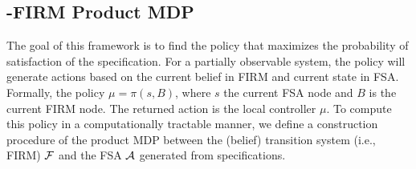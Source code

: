 \documentclass[letterpaper]{article} %
\begin{document}

\subsection{\DTL-FIRM Product MDP}
\label{sec:DTL-FIRM}
The goal of this framework is to find the policy that maximizes the probability of satisfaction of the \DTL specification. For a partially observable system, the policy will generate actions based on the current belief in FIRM and current state in FSA. Formally, the policy $\mu=\pi(s,B)$, where $s$ the current FSA node and $B$ is the current FIRM node. The returned action is the local controller $\mu$.
To compute this policy in a computationally tractable manner, we define a construction procedure of the product MDP between the (belief) transition system (i.e., FIRM) $\mathcal{F}$ and the FSA $\mathcal{A}$ generated from specifications.
\end{document}
